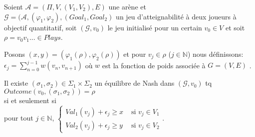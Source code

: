 \begin{propriete}
	\label{prop:outEN2}
	Soient $\mathcal{A} = (\Pi, V, (V_{1}, V_{2}), E)$ une arène et $\mathcal{G} = (\mathcal{A}, (\varphi _{1}, \varphi _{2}), (Goal_{1}, Goal_{2})$ un jeu d'atteignabilité à deux joueurs à objectif quantitatif, soit $(\mathcal{G}, v_{0})$ le jeu initialisé pour un certain $v_{0} \in V $ et soit $\rho = v_{0}v_{1}... \in Plays$. 
	
	Posons $(x,y) = (\varphi _{1}(\rho), \varphi _{2}(\rho))$ et pour $v_{j} \in \rho$ ($j \in \mathbb{N}$) nous définissons: $\epsilon _{j} = \sum _{n= 0} ^{j-1} w(v_{n},v_{n+1})$ où $w$ est la fonction de poids associée à $G = (V,E)$ .
	
	\begin{center}Il existe $(\sigma _{1},\sigma _{2}) \in \Sigma _{1} \times \Sigma _{2}$ un équilibre de Nash dans $(\mathcal{G},v_{0})$ tq $Outcome(v_{0},(\sigma _{1},\sigma _{2})) = \rho$\\ $\text{}$\\ si et seulement si\\$\text{}$\\ pour tout $j \in \mathbb{N}$, $\begin{cases}
													Val_{1}(v_{j}) + \epsilon _{j} \geq x & \text{ si } v_{j} \in V_{1} \\
													Val_{2}(v_{j}) + \epsilon _{j} \geq y & \text{ si } v_{j} \in V_{2} 
													\end{cases}$.\end{center}  
\end{propriete}
	
 						